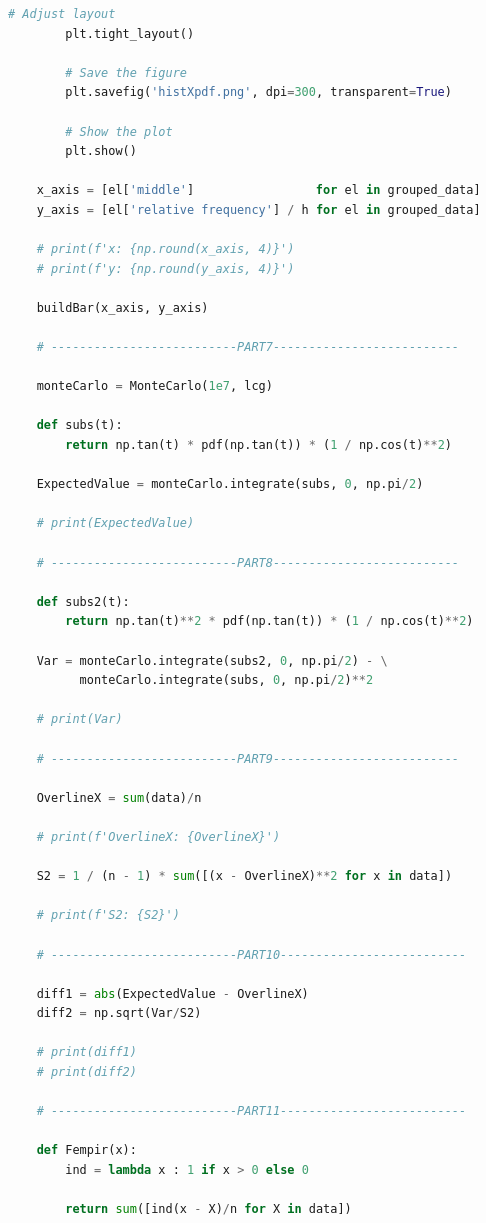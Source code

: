 \documentclass[a4paper, 14pt]{extarticle}
\begin{document}
\begin{center}
\begin{lstlisting}[language=Python]
        # Adjust layout
        plt.tight_layout()

        # Save the figure
        plt.savefig('histXpdf.png', dpi=300, transparent=True)

        # Show the plot
        plt.show()

    x_axis = [el['middle']                 for el in grouped_data]
    y_axis = [el['relative frequency'] / h for el in grouped_data]

    # print(f'x: {np.round(x_axis, 4)}')
    # print(f'y: {np.round(y_axis, 4)}')

    buildBar(x_axis, y_axis)

    # --------------------------PART7--------------------------

    monteCarlo = MonteCarlo(1e7, lcg)

    def subs(t):
        return np.tan(t) * pdf(np.tan(t)) * (1 / np.cos(t)**2) 

    ExpectedValue = monteCarlo.integrate(subs, 0, np.pi/2)
    
    # print(ExpectedValue)

    # --------------------------PART8--------------------------

    def subs2(t):
        return np.tan(t)**2 * pdf(np.tan(t)) * (1 / np.cos(t)**2) 

    Var = monteCarlo.integrate(subs2, 0, np.pi/2) - \
          monteCarlo.integrate(subs, 0, np.pi/2)**2
    
    # print(Var)

    # --------------------------PART9--------------------------

    OverlineX = sum(data)/n

    # print(f'OverlineX: {OverlineX}')

    S2 = 1 / (n - 1) * sum([(x - OverlineX)**2 for x in data])

    # print(f'S2: {S2}')

    # --------------------------PART10--------------------------

    diff1 = abs(ExpectedValue - OverlineX)
    diff2 = np.sqrt(Var/S2)

    # print(diff1)
    # print(diff2)

    # --------------------------PART11--------------------------

    def Fempir(x):
        ind = lambda x : 1 if x > 0 else 0

        return sum([ind(x - X)/n for X in data])


\end{lstlisting}
\end{center}
\end{document}
